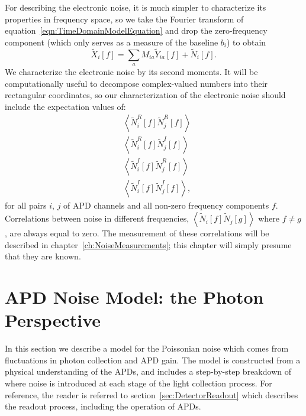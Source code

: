 For describing the electronic noise, it is much simpler to characterize its properties in frequency space, so we take the Fourier transform of equation~\ref{eqn:TimeDomainModelEquation} and drop the zero-frequency component (which only serves as a measure of the baseline $b_i$) to obtain
\begin{equation}\label{FrequencyDomainModelEquation}
\widetilde{X}_i[f] = \sum_a M_{ia}\widetilde{Y}_{ia}[f] + \widetilde{N}_i[f].
\end{equation}
We characterize the electronic noise by its second moments.  It will be computationally useful to decompose complex-valued numbers into their rectangular coordinates, so our characterization of the electronic noise should include the expectation values of:
\begin{subequations}\label{eq:FirstStatementOfNoiseCorrelations}\begin{align}
&\left< \widetilde{N}^R_i[f]\widetilde{N}^R_j[f] \right> \\
&\left< \widetilde{N}^R_i[f]\widetilde{N}^I_j[f] \right> \\
&\left< \widetilde{N}^I_i[f]\widetilde{N}^R_j[f] \right> \\
&\left< \widetilde{N}^I_i[f]\widetilde{N}^I_j[f] \right>,
\end{align}\end{subequations}
for all pairs $i$, $j$ of APD channels and all non-zero frequency components $f$.  Correlations between noise in different frequencies, $\left<\widetilde{N}_i[f]\widetilde{N}_j[g]\right>$ where $f \ne g$, are always equal to zero.  The measurement of these correlations will be described in chapter~\ref{ch:NoiseMeasurements}; this chapter will simply presume that they are known.

\section{APD Noise Model: the Photon Perspective}\label{sec:DescriptionOfPhotonNoise}

In this section we describe a model for the Poissonian noise which comes from fluctuations in photon collection and APD gain.  The model is constructed from a physical understanding of the APDs, and includes a step-by-step breakdown of where noise is introduced at each stage of the light collection process.  For reference, the reader is referred to section~\ref{sec:DetectorReadout} which describes the readout process, including the operation of APDs.

